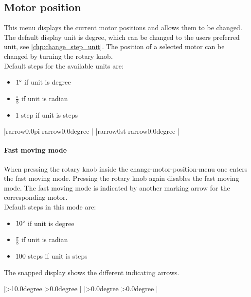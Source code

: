 
\subsection{Motor position}
\label{menu_motor_pos}
This menu displays the current motor positions and allows them to be changed. The default display unit is degree, which can be changed to the users preferred unit, see \ref{chp:change_step_unit}. The position of a selected motor can be changed by turning the rotary knob.\\
Default steps for the available units are:
\begin{itemize}
\item $1\degree$ if unit is degree
\item $\frac{\pi}{8}$ if unit is radian
\item 1 step if unit is steps
\end{itemize}
\begin{center}
  |{rarrow}0.0{pi}   {rarrow}0.0{degree} |
             |{rarrow}0st    {rarrow}0.0{degree} |
\end{center}


\paragraph{Fast moving mode}
When pressing the rotary knob inside the change-motor-position-menu one enters the fast moving mode. Pressing the rotary knob again disables the fast moving mode. The fast moving mode is indicated by another marking arrow for the corresponding motor.\\
Default steps in this mode are:
\begin{itemize}
  \item $10\degree$ if unit is degree
  \item $\frac{\pi}{8}$ if unit is radian
  \item 100 steps if unit is steps
\end{itemize}
The snapped display shows the different indicating arrows.
\begin{center}
  |>10.0{degree} >0.0{degree} |
             |>0.0{degree}  >0.0{degree} |
\end{center}


